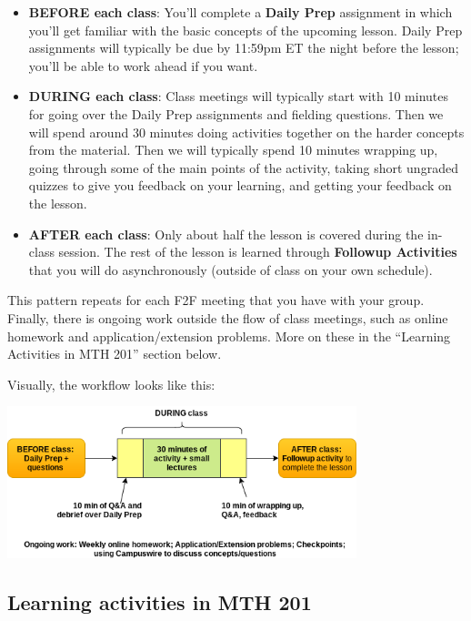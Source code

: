 \documentclass[]{article}
\providecommand{\tightlist}{%
  \setlength{\itemsep}{0pt}\setlength{\parskip}{0pt}}
\begin{document}
\begin{itemize}
\tightlist
\item
  \textbf{BEFORE each class}: You'll complete a \textbf{Daily Prep}
  assignment in which you'll get familiar with the basic concepts of the
  upcoming lesson. Daily Prep assignments will typically be due by
  11:59pm ET the night before the lesson; you'll be able to work ahead
  if you want.
\item
  \textbf{DURING each class}: Class meetings will typically start with
  10 minutes for going over the Daily Prep assignments and fielding
  questions. Then we will spend around 30 minutes doing activities
  together on the harder concepts from the material. Then we will
  typically spend 10 minutes wrapping up, going through some of the main
  points of the activity, taking short ungraded quizzes to give you
  feedback on your learning, and getting your feedback on the lesson.
\item
  \textbf{AFTER each class}: Only about half the lesson is covered
  during the in-class session. The rest of the lesson is learned through
  \textbf{Followup Activities} that you will do asynchronously (outside
  of class on your own schedule).
\end{itemize}

This pattern repeats for each F2F meeting that you have with your group. Finally, there is ongoing work outside the flow of class meetings, such
as online homework and application/extension problems. More on these in
the ``Learning Activities in MTH 201'' section below.

Visually, the workflow looks like this:

\begin{center}
    \includegraphics[width=4in]{201workflow.png}
\end{center}

\hypertarget{learning-activities-in-mth-201}{%
\subsection{Learning activities in MTH
201}\label{learning-activities-in-mth-201}}
\end{document}
